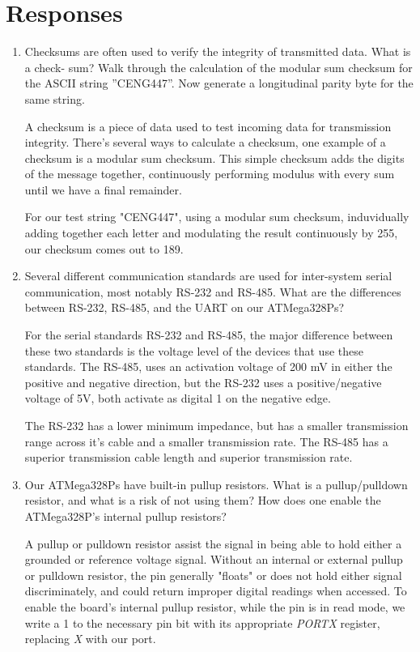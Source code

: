 \documentclass[letterpaper,11pt]{texMemo} %
\begin{document}
\section*{Responses}
\begin{enumerate}
    \item Checksums are often used to verify the integrity of transmitted data. What is a check-
sum? Walk through the calculation of the modular sum checksum for the ASCII string
”CENG447”. Now generate a longitudinal parity byte for the same string.
 
    A checksum is a piece of data used to test incoming data for transmission 
integrity. There's several ways to calculate a checksum, one example of a checksum is a 
modular sum checksum. This simple checksum adds the digits of the message together, continuously
performing modulus with every sum until we have a final remainder.

    For our test string "CENG447", using a modular sum checksum, induvidually
adding together each letter and modulating the result continuously by 255, our checksum comes out
to 189.

    \item Several different communication standards are used for inter-system serial communication,
most notably RS-232 and RS-485. What are the differences between RS-232, RS-485, and the
UART on our ATMega328Ps?

    For the serial standards RS-232 and RS-485, the major difference between these two standards is
the voltage level of the devices that use these standards. The RS-485, uses an activation voltage of
200 mV in either the positive and negative direction, but the RS-232 uses a positive/negative voltage
of 5V, both activate as digital 1 on the negative edge.

    The RS-232 has a lower minimum impedance, but has a smaller transmission range across it's cable
and a smaller transmission rate. The RS-485 has a superior transmission cable length and superior
transmission rate.

    \item Our ATMega328Ps have built-in pullup resistors. What is a pullup/pulldown resistor, and
what is a risk of not using them? How does one enable the ATMega328P’s internal pullup
resistors?

    A pullup or pulldown resistor assist the signal in being able to hold either a grounded or
reference voltage signal. Without an internal or external pullup or pulldown resistor, the pin
generally "floats" or does not hold either signal discriminately, and could return improper
digital readings when accessed. To enable the board's internal pullup resistor, while the pin
is in read mode, we write a 1 to the necessary pin bit with its appropriate \textit{PORTX} 
register, replacing \textit{X} with our port.

\end{enumerate}
\end{document}
